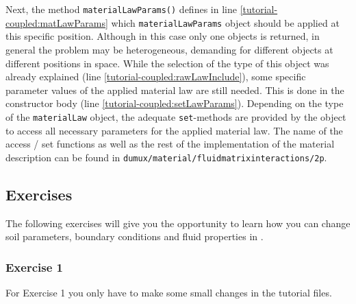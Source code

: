 Next, the method \texttt{materialLawParams()} defines in line 
\ref{tutorial-coupled:matLawParams} which \verb+materialLawParams+ object 
 should be applied at this specific position. Although in this case only one objects is returned, 
in general the problem may be heterogeneous, demanding for different objects at different positions in space. 
While the selection of the type of this object was already explained (line \ref{tutorial-coupled:rawLawInclude}),
 some specific parameter 
values of the applied material law are still needed. This is 
done in the constructor body (line \ref{tutorial-coupled:setLawParams}).
Depending on the type of the \texttt{materialLaw} object, the adequate \texttt{set}-methods
are provided by the object to access all necessary parameters 
for the applied material law. The name of the access / set functions as well as the rest of the implementation 
of the material description can be found in 
\verb+dumux/material/fluidmatrixinteractions/2p+.

\subsection{Exercises}
\label{tutorial-coupled:exercises}
The following exercises will give you the opportunity to learn how you
can change soil parameters, boundary conditions and fluid properties
in \Dumux. 

\subsubsection{Exercise 1}
\renewcommand{\labelenumi}{\alph{enumi})} For Exercise 1 you only have
to make some small changes in the tutorial files.  

